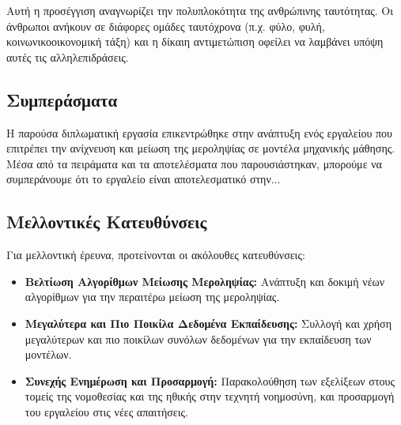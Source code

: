 \documentclass[12pt,twoside]{article}
\newcommand{\en}{\selectlanguage{english}}
\newcommand{\gr}{\selectlanguage{greek}}
\begin{document}
Αυτή η προσέγγιση αναγνωρίζει την πολυπλοκότητα της ανθρώπινης ταυτότητας. Οι άνθρωποι ανήκουν σε διάφορες ομάδες ταυτόχρονα (π.χ. φύλο, φυλή, κοινωνικοοικονομική τάξη) και η δίκαιη αντιμετώπιση οφείλει να λαμβάνει υπόψη αυτές τις αλληλεπιδράσεις.

\subsection{Συμπεράσματα}
Η παρούσα διπλωματική εργασία επικεντρώθηκε στην ανάπτυξη ενός εργαλείου που επιτρέπει την ανίχνευση και μείωση της μεροληψίας σε μοντέλα μηχανικής μάθησης. Μέσα από τα πειράματα και τα αποτελέσματα που παρουσιάστηκαν, μπορούμε να συμπεράνουμε ότι το εργαλείο είναι αποτελεσματικό στην...

\subsection{Μελλοντικές Κατευθύνσεις}
Για μελλοντική έρευνα, προτείνονται οι ακόλουθες κατευθύνσεις:

\begin{itemize}
    \item \textbf{Βελτίωση Αλγορίθμων Μείωσης Μεροληψίας:} Ανάπτυξη και δοκιμή νέων αλγορίθμων για την περαιτέρω μείωση της μεροληψίας.
    \item \textbf{Μεγαλύτερα και Πιο Ποικίλα Δεδομένα Εκπαίδευσης:} Συλλογή και χρήση μεγαλύτερων και πιο ποικίλων συνόλων δεδομένων για την εκπαίδευση των μοντέλων.
    \item \textbf{Συνεχής Ενημέρωση και Προσαρμογή:} Παρακολούθηση των εξελίξεων στους τομείς της νομοθεσίας και της ηθικής στην τεχνητή νοημοσύνη, και προσαρμογή του εργαλείου στις νέες απαιτήσεις.
\end{itemize}

\newpage
\gr
\en
\thispagestyle{plain}
\renewcommand{\bibname}{\gr Βιβλιογραφία}

\end{document}
